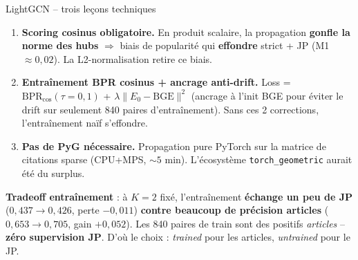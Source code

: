 \documentclass[aspectratio=169,10pt]{beamer}
\newcommand{\warnbox}[1]{%
  \begin{center}
  \colorbox{red!10}{\parbox{0.92\linewidth}{\centering #1}}
  \end{center}}
\begin{document}
\begin{frame}{LightGCN -- trois leçons techniques}
  \footnotesize
  \begin{enumerate}\setlength{\itemsep}{0.5em}
    \item \textbf{Scoring cosinus obligatoire.} En produit scalaire, la propagation
    \textbf{gonfle la norme des hubs} $\Rightarrow$ biais de popularité qui
    \textbf{effondre} strict + JP (M1 $\approx 0{,}02$).
    La L2-normalisation retire ce biais.
    \item \textbf{Entraînement BPR cosinus + ancrage anti-drift.}
    Loss = $\mathrm{BPR}_{\cos}(\tau{=}0{,}1)$ + $\lambda \lVert E_0 - \mathrm{BGE} \rVert^2$
    (ancrage à l'init BGE pour éviter le drift sur seulement 840 paires d'entraînement).
    Sans ces 2 corrections, l'entraînement naïf s'effondre.
    \item \textbf{Pas de PyG nécessaire.} Propagation pure PyTorch sur la matrice de citations
    sparse (CPU+MPS, $\sim 5$ min). L'écosystème \texttt{torch\_geometric} aurait été du surplus.
  \end{enumerate}

  \vspace{0.4em}
  \warnbox{\scriptsize \textbf{Tradeoff entraînement} : à $K{=}2$ fixé, l'entraînement
  \textbf{échange un peu de JP} ($0{,}437 \to 0{,}426$, perte $-0{,}011$) \textbf{contre
  beaucoup de précision articles} ($0{,}653 \to 0{,}705$, gain $+0{,}052$).
  Les 840 paires de train sont des positifs \emph{articles} -- \textbf{zéro supervision JP}.
  D'où le choix : \emph{trained} pour les articles, \emph{untrained} pour le JP.}
\end{frame}
\end{document}
